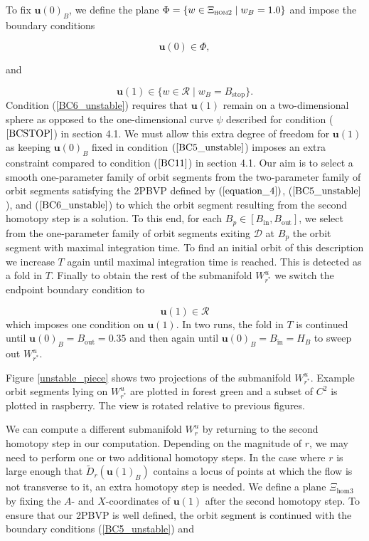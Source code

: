 \documentclass{ws-ijbc}
\begin{document}
To fix $\mathbf{u}(0)_B$, we define the plane $\Phi = \{w \in \Xi_{\textsc{hom2}} \; | \;  w_B=1.0\}$ and impose the boundary conditions

\begin{equation}
\mathbf{u}(0) \in \Phi,
\label{BC5_unstable}
\end{equation}

\noindent
and 

\begin{equation}
\mathbf{u}(1) \in \{ w \in \mathscr{R} \; | \; w_B=B_{\mathrm{stop}}\}.
\label{BC6_unstable}
\end{equation}
\noindent
Condition (\ref{BC6_unstable}) requires that $\mathbf{u}(1)$ remain on a two-dimensional sphere as opposed to the one-dimensional curve $\psi$ described for condition ($\ref{BCSTOP}$) in section 4.1.  We must allow this extra degree of freedom for $\mathbf{u}(1)$ as keeping $\mathbf{u}(0)_B$ fixed in condition $(\ref{BC5_unstable}$) imposes an extra constraint compared to condition ($\ref{BC11}$) in section 4.1.  Our aim is to select a smooth one-parameter family of orbit segments from the two-parameter family of orbit segments satisfying the 2PBVP defined by $(\ref{equation_4})$, ($\ref{BC5_unstable}$), and ($\ref{BC6_unstable}$) to which the orbit segment resulting from the second homotopy step is a solution.  To this end, for each $B_p \in [B_{\mathrm{in}},B_{\mathrm{out}}]$, we select from the one-parameter family of orbit segments exiting $\mathscr{D}$ at $B_p$ the orbit segment with maximal integration time.  To find an initial orbit of this description we increase $T$ again until maximal integration time is reached.  This is detected as a fold in $T$.  Finally to obtain the rest of the submanifold $W^u_{r^*}$ we switch the endpoint boundary condition to

\begin{equation}
\mathbf{u}(1) \in \mathscr{R}
\label{BC7_unstable}
\end{equation}
\noindent
which imposes one condition on $\mathbf{u}(1)$.  In two runs, the fold in $T$ is continued until $\mathbf{u}(0)_B=B_{\mathrm{out}}=0.35$ and then again until $\mathbf{u}(0)_B=B_{\mathrm{in}}=H_B$ to sweep out $W^u_{r^*}$.

Figure \ref{unstable_piece} shows two projections of the submanifold $W^u_{r^*}$.  Example orbit segments lying on $W^u_{r^*}$ are plotted in forest green and a subset of $C^2$ is plotted in raspberry.  The view is rotated relative to previous figures.

We can compute a different submanifold $W^u_r$ by returning to the second homotopy step in our computation.   Depending on the magnitude of $r$, we may need to perform one or two additional homotopy steps.  In the case where $r$ is large enough that $\widetilde{D}_r(\mathbf{u}(1)_B)$ contains a locus of points at which the flow is not transverse to it, an extra homotopy step is needed.  We define a plane $\Xi_{\mathrm{hom3}}$ by fixing the $A$- and $X$-coordinates of $\mathbf{u}(1)$ after the second homotopy step.  To ensure that our 2PBVP is well defined, the orbit segment is continued with the boundary conditions (\ref{BC5_unstable}) and
\end{document}
